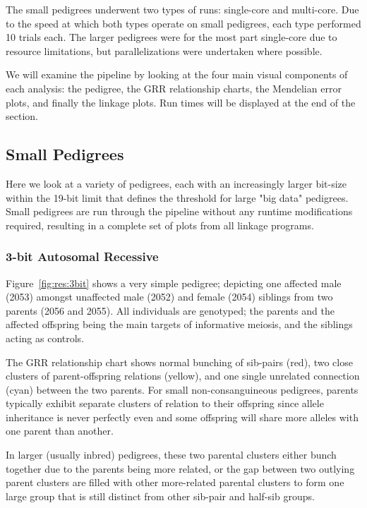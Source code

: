 The small pedigrees underwent two types of runs: single-core and multi-core. Due to the speed at which both types operate on small pedigrees, each type performed 10 trials each. The larger pedigrees were for the most part single-core due to resource limitations, but parallelizations were undertaken where possible. 

We will examine the pipeline by looking at the four main visual components of each analysis: the pedigree, the GRR relationship charts, the Mendelian error plots, and finally the linkage plots. Run times will be displayed at the end of the section.

\subsection{Small Pedigrees}

Here we look at a variety of pedigrees, each with an increasingly larger bit-size within the 19-bit limit that defines the threshold for large "big data" pedigrees. Small pedigrees are run through the pipeline without any runtime modifications required, resulting in a complete set of plots from all linkage programs.

\subsubsection*{3-bit Autosomal Recessive}


Figure~\ref{fig:res:3bit} shows a very simple pedigree; depicting one affected male (2053) amongst unaffected male (2052) and female (2054) siblings from two parents (2056 and 2055). All individuals are genotyped; the parents  and the affected offspring being the main targets of informative meiosis, and the siblings acting as controls.  

The GRR relationship chart shows normal bunching of sib-pairs (red), two close clusters of parent-offspring relations (yellow), and one single unrelated connection (cyan) between the two parents. For small non-consanguineous pedigrees, parents typically exhibit separate clusters of relation to their offspring since allele inheritance is never perfectly even and some offspring will share more alleles with one parent than another. 

In larger (usually inbred) pedigrees, these two parental clusters either bunch together due to the parents being more related, or the gap between two outlying parent clusters are filled with other more-related parental clusters to form one large group that is still distinct from other sib-pair and half-sib groups.

